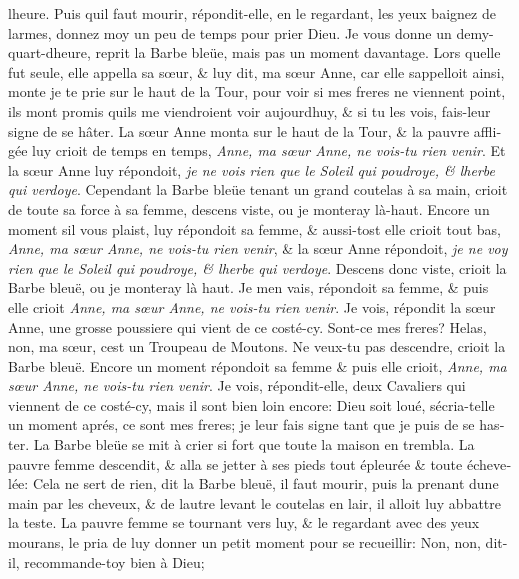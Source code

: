 \documentclass[14pt,a4paper]{memoir}
\begin{document}
{{\begin{otherlanguage}{french}
l\textquotesingle heure. Puis qu\textquotesingle il faut mourir,
répondit-elle, en le regardant, les yeux baignez de larmes, donnez moy
un peu de temps pour prier Dieu. Je vous donne un
demy-quart-d\textquotesingle heure, reprit la Barbe bleüe, mais pas un
moment davantage. Lors qu\textquotesingle elle fut seule, elle appella
sa sœur, \& luy dit, ma sœur Anne, car elle s\textquotesingle appelloit
ainsi, monte je te prie sur le haut de la Tour, pour voir si mes freres
ne viennent point, ils m\textquotesingle ont promis
qu\textquotesingle ils me viendroient voir aujourd\textquotesingle huy,
\& si tu les vois, fais-leur signe de se hâter. La sœur Anne monta sur
le haut de la Tour, \& la pauvre affligée luy crioit de temps en temps,
\emph{Anne, ma sœur Anne, ne vois-tu rien venir}. Et la sœur Anne luy
répondoit, \emph{je ne vois rien que le Soleil qui poudroye, \&
l\textquotesingle herbe qui verdoye}. Cependant la Barbe bleüe tenant un
grand coutelas à sa main, crioit de toute sa force à sa femme, descens
viste, ou je monteray là-haut. Encore un moment s\textquotesingle il
vous plaist, luy répondoit sa femme, \& aussi-tost elle crioit tout bas,
\emph{Anne, ma sœur Anne, ne vois-tu rien venir}, \& la sœur Anne
répondoit, \emph{je ne voy rien que le Soleil qui poudroye, \&
l\textquotesingle herbe qui verdoye}. Descens donc viste, crioit la
Barbe bleuë, ou je monteray là haut. Je m\textquotesingle en vais,
répondoit sa femme, \& puis elle crioit \emph{Anne, ma sœur Anne, ne
vois-tu rien venir}. Je vois, répondit la sœur Anne, une grosse
poussiere qui vient de ce costé-cy. Sont-ce mes freres? Helas, non, ma
sœur, c\textquotesingle est un Troupeau de Moutons. Ne veux-tu pas
descendre, crioit la Barbe bleuë. Encore un moment répondoit sa femme \&
puis elle crioit, \emph{Anne, ma sœur Anne, ne vois-tu rien venir}. Je
vois, répondit-elle, deux Cavaliers qui viennent de ce costé-cy, mais il
sont bien loin encore: Dieu soit loué,
s\textquotesingle écria-t\textquotesingle elle un moment aprés, ce sont
mes freres; je leur fais signe tant que je puis de se haster. La Barbe
bleüe se mit à crier si fort que toute la maison en trembla. La pauvre
femme descendit, \& alla se jetter à ses pieds tout épleurée \& toute
échevelée: Cela ne sert de rien, dit la Barbe bleuë, il faut mourir,
puis la prenant d\textquotesingle une main par les cheveux, \& de
l\textquotesingle autre levant le coutelas en l\textquotesingle air, il
alloit luy abbattre la teste. La pauvre femme se tournant vers luy, \&
le regardant avec des yeux mourans, le pria de luy donner un petit
moment pour se recueillir: Non, non, dit-il, recommande-toy bien à Dieu;

\end{otherlanguage}}}
\end{document}
